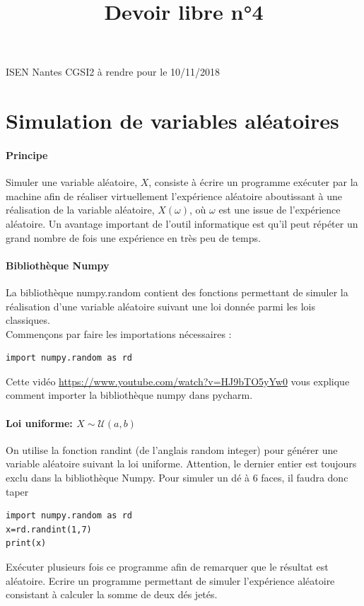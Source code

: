 \documentclass{article}
\theoremstyle{remark}
\begin{document}
ISEN Nantes CGSI2 \hfill à rendre pour le 10/11/2018
\title{Devoir libre n°4}
\maketitle

\section*{Simulation de variables aléatoires}

\paragraph{Principe}
Simuler une variable aléatoire, $X$, consiste à écrire un programme exécuter par la machine afin de réaliser virtuellement l'expérience
aléatoire aboutissant à une réalisation de la variable aléatoire, $X(\omega)$, où $\omega$ est une issue de l'expérience aléatoire. 
Un avantage important de l'outil informatique est qu'il peut répéter
un grand nombre de fois une expérience en très peu de temps.
\paragraph*{Bibliothèque Numpy}
La bibliothèque numpy.random contient des fonctions permettant de simuler la
réalisation d'une variable aléatoire suivant une loi donnée parmi les lois classiques.\\ 
Commençons par faire les importations nécessaires :
\begin{lstlisting}
import numpy.random as rd
\end{lstlisting}
Cette vidéo \url{https://www.youtube.com/watch?v=HJ9bTO5yYw0} vous explique comment importer la bibliothèque numpy dans pycharm.
\paragraph{Loi uniforme: $X\sim\mathcal{U}(a, b)$}
On utilise la fonction randint (de l'anglais random integer) pour générer une variable aléatoire suivant la loi uniforme. Attention, le dernier entier est toujours exclu dans la bibliothèque Numpy. Pour simuler un dé à 6 faces, il faudra donc taper
\begin{lstlisting}
import numpy.random as rd
x=rd.randint(1,7)
print(x)
\end{lstlisting}
Exécuter plusieurs fois ce programme afin de remarquer que le résultat est aléatoire.
Ecrire un programme permettant de simuler l'expérience aléatoire consistant à calculer la somme de deux dés jetés.
\end{document}
